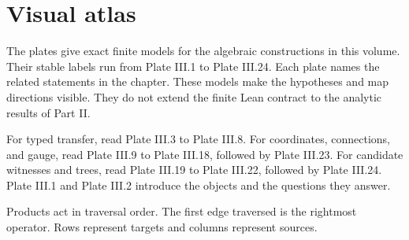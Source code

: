 \documentclass[11pt,letterpaper]{article}
\theoremstyle{plain}
\theoremstyle{definition}
\theoremstyle{remark}
\begin{document}
\section{Visual atlas}\label{app:visual-atlas}
The plates give exact finite models for the algebraic constructions in this volume. Their stable labels run from Plate III.1 to Plate III.24. Each plate names the related statements in the chapter. These models make the hypotheses and map directions visible. They do not extend the finite Lean contract to the analytic results of Part II.
\begin{readerroadmap}[title={Three routes through the atlas}]
For typed transfer, read Plate III.3 to Plate III.8. For coordinates, connections, and gauge, read Plate III.9 to Plate III.18, followed by Plate III.23. For candidate witnesses and trees, read Plate III.19 to Plate III.22, followed by Plate III.24. Plate III.1 and Plate III.2 introduce the objects and the questions they answer.
\end{readerroadmap}
Products act in traversal order. The first edge traversed is the rightmost operator. Rows represent targets and columns represent sources.
\clearpage
\begingroup
{}\fontsize{10}{12}\selectfont
\setlength{\parskip}{3pt}\setlength{\abovedisplayskip}{6pt}\setlength{\belowdisplayskip}{6pt}

\endgroup
\clearpage
\begingroup\small{}


\endgroup
\end{document}
